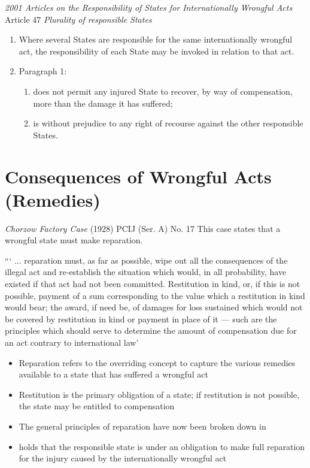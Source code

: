 \begin{conventiondetails}{\textit{2001 Articles on the Responsibility of States for Internationally Wrongful Acts} Article 47}
    \flushleft
    \textit{Plurality of responsible States}

    \begin{enumerate}
        \item Where several States are responsible for the same internationally wrongful act, the responsibility of each State may be invoked in relation to that act.
        \item Paragraph 1:
        \begin{enumerate}[label=(\alph*)]
            \item does not permit any injured State to recover, by way of compensation, more than the damage it has suffered;
            \item is without prejudice to any right of recourse against the other responsible States.
        \end{enumerate}
    \end{enumerate}
\end{conventiondetails}

\section{Consequences of Wrongful Acts (Remedies)}
\begin{casedetails}{\textit{Chorzow Factory Case} (1928) PCIJ (Ser. A) No. 17}
    \flushleft
    This case states that a wrongful state must make reparation.

    \vspace{\baselineskip}

    ``` ... reparation must, as far as possible, wipe out all the consequences of the illegal act and re-establish the situation which would, in all probability, have existed if that act had not been committed. Restitution in kind, or, if this is not possible, payment of a sum corresponding to the value which a restitution in kind would bear; the award, if need be, of damages for loss sustained which would not be covered by restitution in kind or payment in place of it — such are the principles which should serve to determine the amount of compensation due for an act contrary to international law'
\end{casedetails}

\begin{itemize}
    \item Reparation refers to the overriding concept to capture the various remedies available to a state that has suffered a wrongful act
    \item Restitution is the primary obligation of a state; if restitution is not possible, the state may be entitled to compensation
    \item The general principles of reparation have now been broken down in 
    \item {} holds that the responsible state is under an obligation to make full reparation for the injury caused by the internationally wrongful act
\end{itemize}

